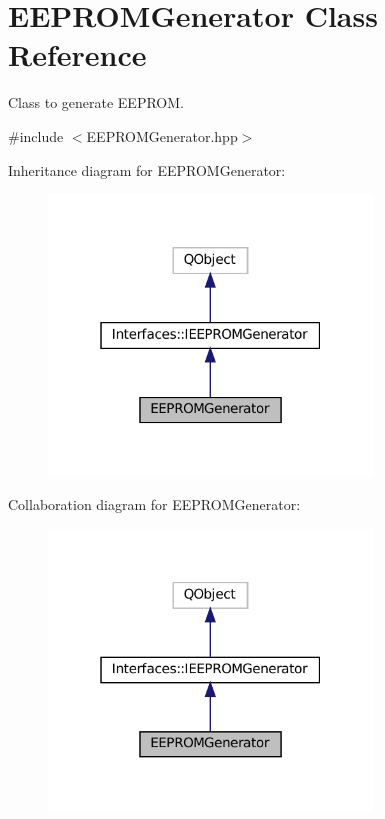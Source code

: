 \hypertarget{class_e_e_p_r_o_m_generator}{}\section{E\+E\+P\+R\+O\+M\+Generator Class Reference}
\label{class_e_e_p_r_o_m_generator}


Class to generate E\+E\+P\+R\+OM.  




{\ttfamily \#include $<$E\+E\+P\+R\+O\+M\+Generator.\+hpp$>$}



Inheritance diagram for E\+E\+P\+R\+O\+M\+Generator\+:\nopagebreak
\begin{figure}[H]
\begin{center}
\leavevmode
\includegraphics[width=244pt]{class_e_e_p_r_o_m_generator__inherit__graph}
\end{center}
\end{figure}


Collaboration diagram for E\+E\+P\+R\+O\+M\+Generator\+:\nopagebreak
\begin{figure}[H]
\begin{center}
\leavevmode
\includegraphics[width=244pt]{class_e_e_p_r_o_m_generator__coll__graph}
\end{center}
\end{figure}
